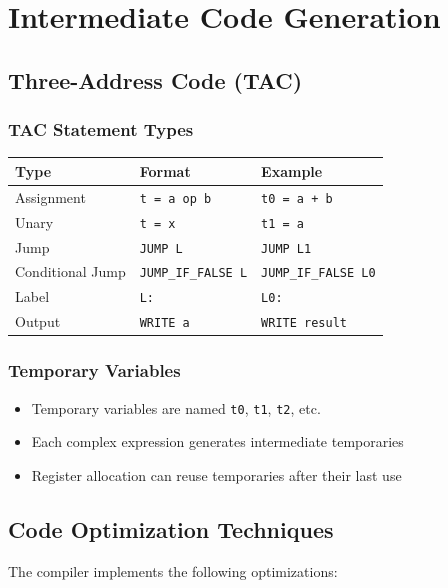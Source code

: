 \documentclass[12pt,a4paper]{report}
\begin{document}
\chapter{Intermediate Code Generation}

\section{Three-Address Code (TAC)}

\subsection{TAC Statement Types}
\begin{center}
\begin{tabular}{|l|l|l|}
\hline
\textbf{Type} & \textbf{Format} & \textbf{Example} \\
\hline
Assignment & \texttt{t = a op b} & \texttt{t0 = a + b} \\
\hline
Unary & \texttt{t = x} & \texttt{t1 = a} \\
\hline
Jump & \texttt{JUMP L} & \texttt{JUMP L1} \\
\hline
Conditional Jump & \texttt{JUMP\_IF\_FALSE L} & \texttt{JUMP\_IF\_FALSE L0} \\
\hline
Label & \texttt{L:} & \texttt{L0:} \\
\hline
Output & \texttt{WRITE a} & \texttt{WRITE result} \\
\hline
\end{tabular}
\end{center}

\subsection{Temporary Variables}
\begin{itemize}
    \item Temporary variables are named \texttt{t0}, \texttt{t1}, \texttt{t2}, etc.
    \item Each complex expression generates intermediate temporaries
    \item Register allocation can reuse temporaries after their last use
\end{itemize}

\section{Code Optimization Techniques}

The compiler implements the following optimizations:
\end{document}
